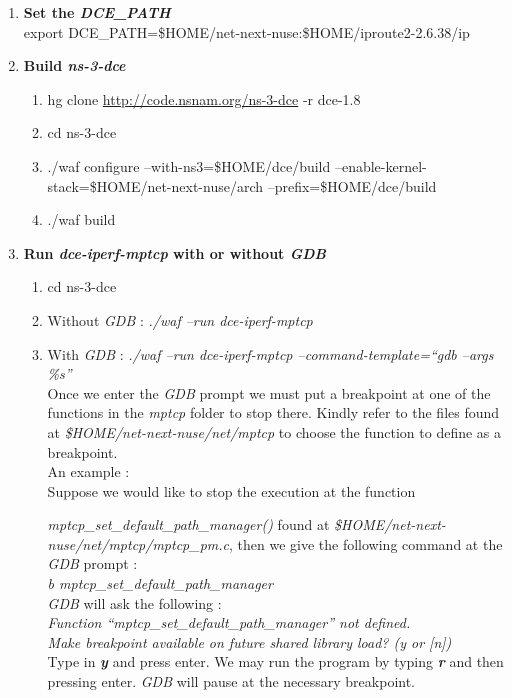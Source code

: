 \documentclass[a4paper,11pt]{article}
\begin{document}
\begin{enumerate}
\begin{enumerate}
				\end{enumerate}

			\item \textbf{Set the \emph{DCE\_PATH}} \\
				export DCE\_PATH=\$HOME/net-next-nuse:\$HOME/iproute2-2.6.38/ip

			\item \textbf{Build \emph{ns-3-dce }}
				\begin{enumerate}
				
					\item hg clone \url{http://code.nsnam.org/ns-3-dce}  -r dce-1.8
					\item cd ns-3-dce
					\item ./waf configure --with-ns3=\$HOME/dce/build --enable-kernel-stack=\$HOME/net-next-nuse/arch --prefix=\$HOME/dce/build
					\item ./waf build
				\end{enumerate}

			\item \textbf{Run \emph{dce-iperf-mptcp} with or without \emph{GDB}}
				\begin{enumerate}
					\item cd ns-3-dce
					\item Without \emph{GDB} : \emph{./waf --run dce-iperf-mptcp} \\
					\item With \emph{GDB} : \emph{./waf --run dce-iperf-mptcp --command-template=``gdb --args \%s''} \\
					Once we enter the \emph{GDB} prompt we must put a breakpoint at one of the functions in the \emph{mptcp} folder to stop there. Kindly refer to the files found at \emph{\$HOME/net-next-nuse/net/mptcp} to choose the function to define as a breakpoint. \\
					An example : \\
					Suppose we would like to stop the execution at the function \raggedright{\emph{mptcp\_set\_default\_path\_manager()}} found at \emph{\$HOME/net-next-nuse/net/mptcp/mptcp\_pm.c}, then we give the following command at the \emph{GDB} prompt : \\
					\emph{b mptcp\_set\_default\_path\_manager} \\
					\emph{GDB} will ask the following : \\
					\emph{Function ``mptcp\_set\_default\_path\_manager'' not defined.\\
					      Make breakpoint available on future shared library load? (y or [n])} \\
					Type in \textbf{\emph{y}} and press enter. We may run the program by typing \textbf{\emph{r}} and then pressing enter. \emph{GDB} will pause at the necessary breakpoint. \\
				\end{enumerate}

		\end{enumerate}
\end{document}
